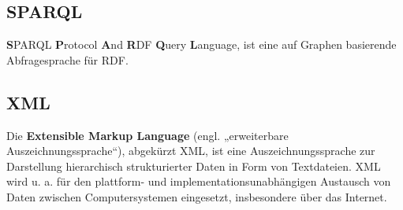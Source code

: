 \documentclass[11pt,a4paper]{article}
\begin{document}
\subsection{SPARQL}
\textbf{S}PARQL \textbf{P}rotocol \textbf{A}nd \textbf{R}DF \textbf{Q}uery \textbf{L}anguage, ist eine auf Graphen basierende Abfragesprache für RDF.
\subsection{XML}
Die \textbf{Extensible Markup Language} (engl. „erweiterbare Auszeichnungssprache“), abgekürzt XML, ist eine Auszeichnungssprache zur Darstellung hierarchisch strukturierter Daten in Form von Textdateien. XML wird u. a. für den plattform- und implementationsunabhängigen Austausch von Daten zwischen Computersystemen eingesetzt, insbesondere über das Internet.
\end{document}
